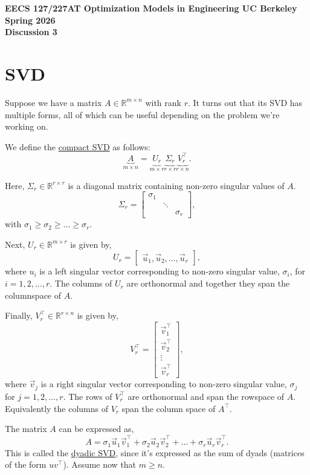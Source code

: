 \documentclass[10pt]{article}
\newcommand{\RR}{\mathbb{R}}
\begin{document}
\begin{center}
{\large\bfseries EECS 127/227AT \hfill Optimization Models in Engineering \hfill UC Berkeley \hfill Spring 2026}\\[6pt]
{\LARGE\bfseries Discussion 3}
\end{center}

\section{SVD}

Suppose we have a matrix $A \in \RR^{m \times n}$ with rank $r$. It turns out that its SVD has multiple forms, all of which can be useful depending on the problem we're working on.

We define the \underline{compact SVD} as follows:
\[
\underbrace{A}_{m \times n} = \underbrace{U_r}_{m \times r} \underbrace{\Sigma_r}_{r \times r} \underbrace{V_r^\top}_{r \times n}.
\]

Here, $\Sigma_r \in \RR^{r \times r}$ is a diagonal matrix containing non-zero singular values of $A$.
\[
\Sigma_r = \begin{bmatrix} \sigma_1 & & \\ & \ddots & \\ & & \sigma_r \end{bmatrix},
\]
with $\sigma_1 \geq \sigma_2 \geq \ldots \geq \sigma_r$.

Next, $U_r \in \RR^{m \times r}$ is given by,
\[
U_r = \begin{bmatrix} \vec{u}_1, \vec{u}_2, \ldots, \vec{u}_r \end{bmatrix},
\]
where $u_i$ is a left singular vector corresponding to non-zero singular value, $\sigma_i$, for $i = 1, 2, \ldots, r$. The columns of $U_r$ are orthonormal and together they span the columnspace of $A$.

Finally, $V_r^\top \in \RR^{r \times n}$ is given by,
\[
V_r^\top = \begin{bmatrix} \vec{v}_1^\top \\ \vec{v}_2^\top \\ \vdots \\ \vec{v}_r^\top \end{bmatrix},
\]
where $\vec{v}_j$ is a right singular vector corresponding to non-zero singular value, $\sigma_j$ for $j = 1, 2, \ldots, r$. The rows of $V_r^\top$ are orthonormal and span the rowspace of $A$. Equivalently the columns of $V_r$ span the column space of $A^\top$.

The matrix $A$ can be expressed as,
\[
A = \sigma_1 \vec{u}_1 \vec{v}_1^\top + \sigma_2 \vec{u}_2 \vec{v}_2^\top + \ldots + \sigma_r \vec{u}_r \vec{v}_r^\top.
\]
This is called the \underline{dyadic SVD}, since it's expressed as the sum of dyads (matrices of the form $uv^\top$). Assume now that $m \geq n$.
\end{document}
